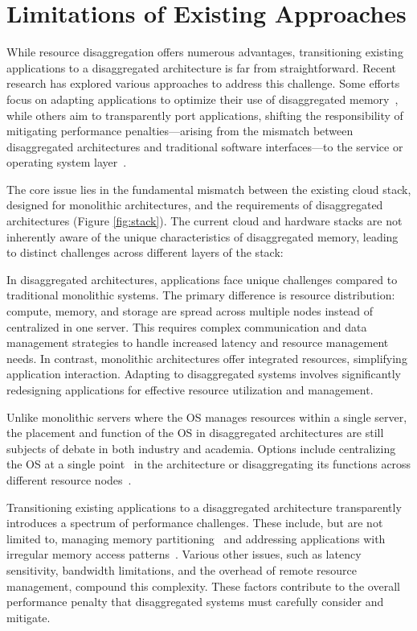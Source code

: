 \section{Limitations of Existing Approaches}

While resource disaggregation offers numerous advantages, transitioning existing applications to a disaggregated architecture is far from straightforward. Recent research has explored various approaches to address this challenge. Some efforts focus on adapting applications to optimize their use of disaggregated memory~\cite{farm, aifm, sherman, existing1}, while others aim to transparently port applications, shifting the responsibility of mitigating performance penalties—arising from the mismatch between disaggregated architectures and traditional software interfaces—to the service or operating system layer~\cite{mind, legoos, fastswap, infiniswap, runtime1, runtime2}.


The core issue lies in the fundamental mismatch between the existing cloud stack, designed for monolithic architectures, and the requirements of disaggregated architectures (Figure \ref{fig:stack}). The current cloud and hardware stacks are not inherently aware of the unique characteristics of disaggregated memory, leading to distinct challenges across different layers of the stack:

 In disaggregated architectures, applications face unique challenges compared to traditional monolithic systems. The primary difference is resource distribution: compute, memory, and storage are spread across multiple nodes instead of centralized in one server. This requires complex communication and data management strategies to handle increased latency and resource management needs. In contrast, monolithic architectures offer integrated resources, simplifying application interaction. Adapting to disaggregated systems involves significantly redesigning applications for effective resource utilization and management.

 Unlike monolithic servers where the OS manages resources within a single server, the placement and function of the OS in disaggregated architectures are still subjects of debate in both industry and academia. Options include centralizing the OS at a single point~\cite{mind} in the architecture or disaggregating its functions across different resource nodes~\cite{legoos}.

 Transitioning existing applications to a disaggregated architecture transparently introduces a spectrum of performance challenges. These include, but are not limited to, managing memory partitioning~\cite{jiffy} and addressing applications with irregular memory access patterns~\cite{chase}. Various other issues, such as latency sensitivity, bandwidth limitations, and the overhead of remote resource management, compound this complexity. These factors contribute to the overall performance penalty that disaggregated systems must carefully consider and mitigate.

